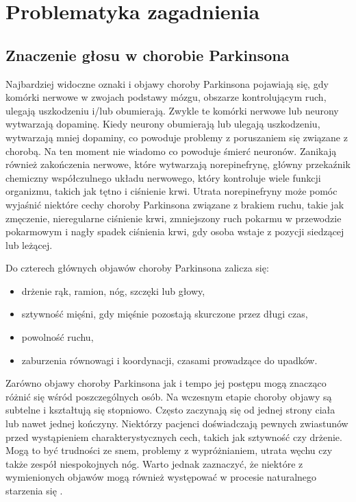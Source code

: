 \chapter{Problematyka zagadnienia}
\label{ch:problematyka}


\section{Znaczenie głosu w chorobie Parkinsona}
\label{sec:znaczenie_glosu}

Najbardziej widoczne oznaki i objawy choroby Parkinsona pojawiają się, gdy komórki nerwowe w zwojach podstawy mózgu,
obszarze kontrolującym ruch, ulegają uszkodzeniu i/lub obumierają.
Zwykle te komórki nerwowe lub neurony wytwarzają dopaminę.
Kiedy neurony obumierają lub ulegają uszkodzeniu, wytwarzają mniej dopaminy, co powoduje problemy z poruszaniem się
związane z chorobą.
Na ten moment nie wiadomo co powoduje śmierć neuronów.
Zanikają również zakończenia nerwowe, które wytwarzają norepinefrynę, główny przekaźnik chemiczny
współczulnego układu nerwowego, który kontroluje wiele funkcji organizmu, takich jak tętno i ciśnienie krwi.
Utrata norepinefryny może pomóc wyjaśnić niektóre cechy choroby Parkinsona związane z brakiem ruchu, takie jak zmęczenie,
nieregularne ciśnienie krwi, zmniejszony ruch pokarmu w przewodzie pokarmowym i nagły spadek ciśnienia krwi, gdy osoba wstaje z pozycji siedzącej lub leżącej.

\vspace{0.5cm}
Do czterech głównych objawów choroby Parkinsona zalicza się:
\begin{itemize}[itemsep=0.05pt]
	\item drżenie rąk, ramion, nóg, szczęki lub głowy,
	\item sztywność mięśni, gdy mięśnie pozostają skurczone przez długi czas,
	\item powolność ruchu,
	\item zaburzenia równowagi i koordynacji, czasami prowadzące do upadków.
\end{itemize}

Zarówno objawy choroby Parkinsona jak i tempo jej postępu mogą znacząco różnić się wśród poszczególnych osób.
Na wczesnym etapie choroby objawy są subtelne i kształtują się stopniowo.
Często zaczynają się od jednej strony ciała lub nawet jednej kończyny.
Niektórzy pacjenci doświadczają pewnych zwiastunów przed wystąpieniem charakterystycznych cech, takich jak sztywność czy drżenie.
Mogą to być trudności ze snem, problemy z wypróżnianiem, utrata węchu czy także zespół niespokojnych nóg.
Warto jednak zaznaczyć, że niektóre z wymienionych objawów mogą również występować w procesie naturalnego starzenia się \cite{National_Institute_on_Aging_2022}.

